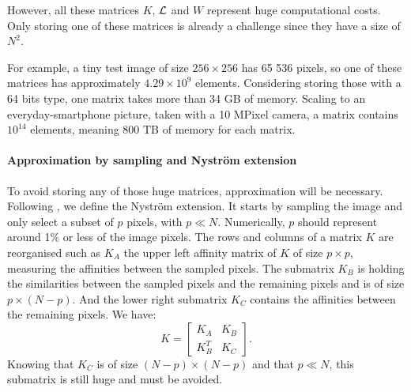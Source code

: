 However, all these matrices \(K\), \(\operatorname{\mathcal{L}}\) and \(W\) represent huge computational costs.
Only storing one of these matrices is already a challenge since they have a size of \(N^2\).

For example, a tiny test image of size \(256 \times 256\) has 65 536 pixels, so one of these matrices has approximately \(4.29 \times 10^9\) elements.
Considering storing those with a 64 bits type, one matrix takes more than 34 GB of memory.
Scaling to an everyday-smartphone picture, taken with a 10 MPixel camera, a matrix contains \(10^{14}\) elements, meaning 800 TB of memory for each matrix.

\paragraph{Approximation by sampling and Nystr\"om extension}

To avoid storing any of those huge matrices, approximation will be necessary.
Following \cite{fowlkes_spectral_2004}, we define the Nystr\"om extension.
It starts by sampling the image and only select a subset of \(p\) pixels, with \(p \ll N\).
Numerically, \(p\) should represent around 1\% or less of the image pixels.
The rows and columns of a matrix \(K\) are reorganised such as \(K_A\) the upper left affinity matrix of \(K\) of size \(p \times p\), measuring the affinities between the sampled pixels.
The submatrix \(K_B\) is holding the similarities between the sampled pixels and the remaining pixels and is of size \(p \times (N-p)\).
And the lower right submatrix \(K_C\) contains the affinities between the remaining pixels.
We have:
\[K = \begin{bmatrix}K_A & K_B \\ K_B^T & K_C\end{bmatrix}.\]
Knowing that \(K_C\) is of size \((N-p) \times (N-p)\) and that \(p \ll N\), this submatrix is still huge and must be avoided.

